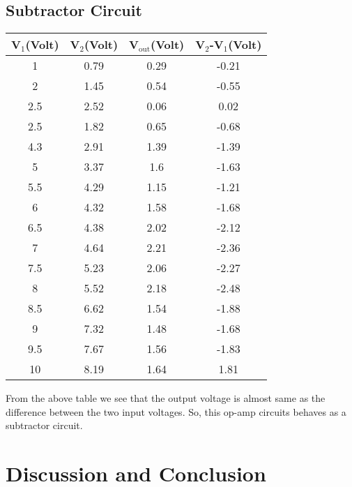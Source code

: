 \documentclass[12pt]{article}
\begin{document}
\subsection{Subtractor Circuit}
\begin{table}[H]
	\centering
	\begin{tabular}{|c|c|c|c|}
		\hline
		V$_1$(Volt) & V$_2$(Volt) & V$_\mathrm{out}$(Volt) & V$_2$-V$_1$(Volt) \\ \hline \hline
		1                    & 0.79                 & 0.29                   & -0.21                       \\ \hline
		2                    & 1.45                 & 0.54                   & -0.55                       \\ \hline
		2.5                  & 2.52                 & 0.06                   & 0.02                        \\ \hline
		2.5                  & 1.82                 & 0.65                   & -0.68                       \\ \hline
		4.3                  & 2.91                 & 1.39                   & -1.39                       \\ \hline
		5                    & 3.37                 & 1.6                    & -1.63                       \\ \hline
		5.5                  & 4.29                 & 1.15                   & -1.21                       \\ \hline
		6                    & 4.32                 & 1.58                   & -1.68                       \\ \hline
		6.5                  & 4.38                 & 2.02                   & -2.12                       \\ \hline
		7                    & 4.64                 & 2.21                   & -2.36                       \\ \hline
		7.5                  & 5.23                 & 2.06                   & -2.27                       \\ \hline
		8                    & 5.52                 & 2.18                   & -2.48                       \\ \hline
		8.5                  & 6.62                 & 1.54                   & -1.88                       \\ \hline
		9                    & 7.32                 & 1.48                   & -1.68                       \\ \hline
		9.5                  & 7.67                 & 1.56                   & -1.83                       \\ \hline
		10                   & 8.19                 & 1.64                   & 1.81                        \\ \hline
	\end{tabular}
\end{table}
From the above table we see that the output voltage is almost same as the difference between the two input voltages. So, this op-amp circuits behaves as a subtractor circuit. 
\section{Discussion and Conclusion}
\end{document}
